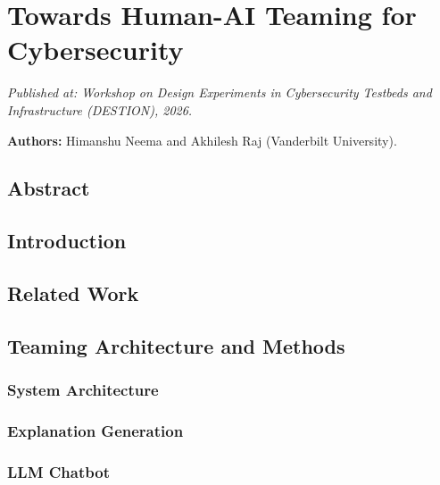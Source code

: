 \chapter{Towards Human-AI Teaming for Cybersecurity}
\label{APP_HumanAI}

\noindent\textit{Published at: Workshop on Design Experiments in Cybersecurity Testbeds and Infrastructure (DESTION), 2026.}

\vspace{0.5em}
\noindent\textbf{Authors:} Himanshu Neema and Akhilesh Raj (Vanderbilt University).

\vspace{1em}

\graphicspath{{Papers/HumanAI/}}

\section*{Abstract}


\section{Introduction}


\section{Related Work}


\section{Teaming Architecture and Methods}


\subsection{System Architecture}


\subsection{Explanation Generation}


\subsection{LLM Chatbot}


